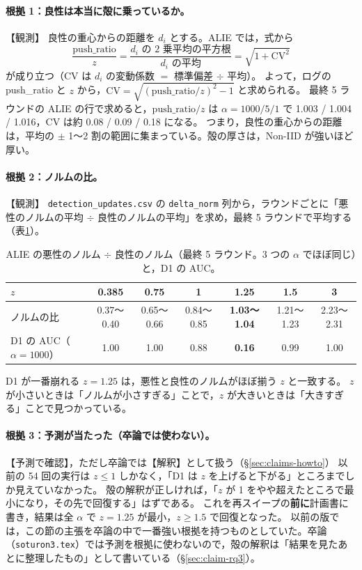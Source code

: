 \documentclass[a4j, dvipdfmx]{jsarticle}  %
\begin{document}
\paragraph{根拠 1：良性は本当に殻に乗っているか。}【観測】
良性の重心からの距離を $d_i$ とする。ALIE では，式から
\begin{equation*}
  \frac{\mathrm{push\_ratio}}{z} = \frac{\text{$d_i$ の 2 乗平均の平方根}}{\text{$d_i$ の平均}} = \sqrt{1 + \mathrm{CV}^2}
\end{equation*}
が成り立つ（CV は $d_i$ の変動係数 $=$ 標準偏差 $\div$ 平均）。
よって，ログの push\_ratio と $z$ から，$\mathrm{CV} = \sqrt{(\mathrm{push\_ratio}/z)^2 - 1}$ と求められる。
最終 5 ラウンドの ALIE の行で求めると，$\mathrm{push\_ratio}/z$ は $\alpha = 1000 / 5 / 1$ で 1.003 / 1.004 / 1.016，CV は約 0.08 / 0.09 / 0.18 になる。
つまり，良性の重心からの距離は，平均の $\pm$ 1〜2 割の範囲に集まっている。殻の厚さは，Non-IID が強いほど厚い。

\paragraph{根拠 2：ノルムの比。}【観測】
\texttt{detection\_updates.csv} の \texttt{delta\_norm} 列から，ラウンドごとに「悪性のノルムの平均 $\div$ 良性のノルムの平均」を求め，最終 5 ラウンドで平均する（表\ref{tab:normratio}）。

\begin{table}[H]
\centering
\caption{ALIE の悪性のノルム $\div$ 良性のノルム（最終 5 ラウンド。3 つの $\alpha$ でほぼ同じ）と，D1 の AUC。}
\label{tab:normratio}
\begin{tabular}{@{}lcccccc@{}}
\toprule
$z$ & 0.385 & 0.75 & 1 & 1.25 & 1.5 & 3 \\
\midrule
ノルムの比 & 0.37〜0.40 & 0.65〜0.66 & 0.84〜0.85 & \textbf{1.03〜1.04} & 1.21〜1.23 & 2.23〜2.31 \\
D1 の AUC（$\alpha = 1000$） & 1.00 & 1.00 & 0.88 & \textbf{0.16} & 0.99 & 1.00 \\
\bottomrule
\end{tabular}
\end{table}

D1 が一番崩れる $z = 1.25$ は，悪性と良性のノルムがほぼ揃う $z$ と一致する。
$z$ が小さいときは「ノルムが小さすぎる」ことで，$z$ が大きいときは「大きすぎる」ことで見つかっている。

\paragraph{根拠 3：予測が当たった（卒論では使わない）。}【予測で確認】，ただし卒論では【解釈】として扱う（\S\ref{sec:claims-howto}）
以前の 54 回の実行は $z \le 1$ しかなく，「D1 は $z$ を上げると下がる」ところまでしか見えていなかった。
殻の解釈が正しければ，「$z$ が 1 をやや超えたところで最小になり，その先で回復する」はずである。
これを再スイープの\textbf{前に}計画書に書き，結果は全 $\alpha$ で $z = 1.25$ が最小，$z \ge 1.5$ で回復となった。
以前の版では，この節の主張を卒論の中で一番強い根拠を持つものとしていた。卒論（\texttt{soturon3.tex}）では予測を根拠に使わないので，殻の解釈は「結果を見たあとに整理したもの」として書いている（\S\ref{sec:claim-rq3}）。
\end{document}
